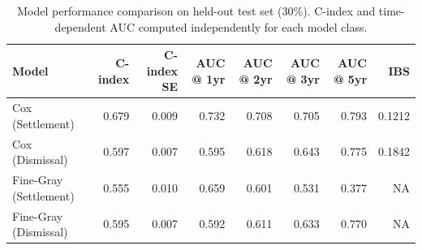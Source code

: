 \begin{table}[!h]
\centering
\caption{\label{tab:model_performance}Model performance comparison on held-out test set (30\%). C-index and time-dependent AUC computed independently for each model class.}
\centering
\begin{tabular}[t]{lrrrrrrr}
\toprule
Model & C-index & C-index SE & AUC @ 1yr & AUC @ 2yr & AUC @ 3yr & AUC @ 5yr & IBS\\
\midrule
Cox (Settlement) & 0.679 & 0.009 & 0.732 & 0.708 & 0.705 & 0.793 & 0.1212\\
Cox (Dismissal) & 0.597 & 0.007 & 0.595 & 0.618 & 0.643 & 0.775 & 0.1842\\
Fine-Gray (Settlement) & 0.555 & 0.010 & 0.659 & 0.601 & 0.531 & 0.377 & NA\\
Fine-Gray (Dismissal) & 0.595 & 0.007 & 0.592 & 0.611 & 0.633 & 0.770 & NA\\
\bottomrule
\end{tabular}
\end{table}

